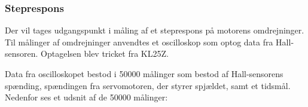 

\subsubsection{Steprespons}
\label{sec:steprespons}

Der vil tages udgangspunkt i måling af et steprespons på motorens omdrejninger. Til målinger af omdrejninger anvendtes et oscilloskop som optog data fra Hall-sensoren. Optagelsen blev tricket fra KL25Z.%

Data fra oscilloskopet bestod i 50000 målinger som bestod af Hall-sensorens spænding, spændingen fra servomotoren, der styrer spjældet, samt et tidsmål. Nedenfor ses et udsnit af de 50000 målinger:

